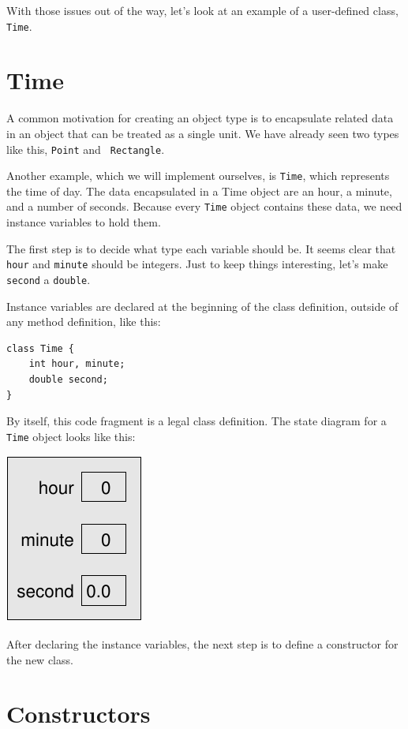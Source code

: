 \documentclass[12pt]{book}
\theoremstyle{exercise}
\begin{document}
With those issues out of the way, let's look at an example of
a user-defined class, {\tt Time}.


\section{Time}

A common motivation for creating an object type is to encapsulate
related data in an object that can be treated as a single unit.  We
have already seen two types like this, {\tt Point} and {\tt
Rectangle}.

Another example, which we will implement ourselves, is {\tt Time},
which represents the time of day.  The data encapsulated in a Time
object are an hour, a minute, and a number of seconds.  Because every
{\tt Time} object contains these data, we need instance
variables to hold them.

The first step is to decide what type each variable should be.  It
seems clear that {\tt hour} and {\tt minute} should be integers.  Just
to keep things interesting, let's make {\tt second} a {\tt double}.


Instance variables are declared at the beginning of the class
definition, outside of any method definition, like this:

\begin{lstlisting}
class Time {
    int hour, minute;
    double second;
}
\end{lstlisting}
%
By itself, this code fragment is a legal class definition.  The
state diagram for a {\tt Time} object looks like this:


\includegraphics{figs/time.pdf}


After declaring the instance variables, the next step is
to define a constructor for the new class.

\section{Constructors}
\end{document}
